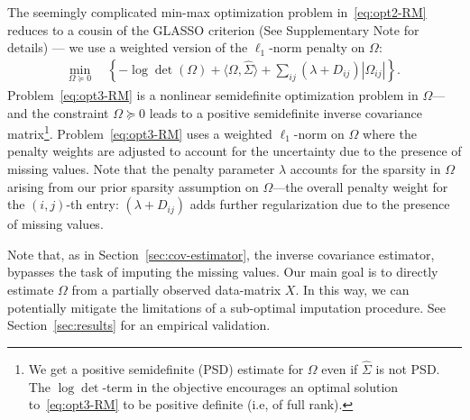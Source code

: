 The seemingly complicated min-max optimization problem in~\eqref{eq:opt2-RM}
reduces to a cousin of the GLASSO criterion (See Supplementary Note for details) --- we use a weighted version of the $\ell_{1}$-norm penalty on $\Omega$: 
\begin{equation}\label{eq:opt3-RM}
    \begin{aligned}
    \min_{\Omega \succeq 0} ~~ & \left \{- \log \det ( \Omega ) + \langle \Omega, \hat{\Sigma} \rangle +  \sum_{ij} (\lambda +  D_{ij})|\Omega_{ij}|  \right \}.
    \end{aligned}
\end{equation}
Problem~\eqref{eq:opt3-RM} is a nonlinear semidefinite optimization problem in $\Omega$---and the constraint $\Omega \succeq 0$ leads to a positive semidefinite inverse covariance matrix\footnote{We get a positive semidefinite (PSD) estimate for $\Omega$ even if $\hat{\Sigma}$ is not PSD. The $\log\det$-term in the objective encourages an optimal solution to~\eqref{eq:opt3-RM} to be positive definite (i.e, of full rank).}.
Problem~\eqref{eq:opt3-RM} uses a weighted $\ell_{1}$-norm on $\Omega$ where the penalty weights are adjusted to account for the uncertainty due to the presence of missing values. Note that the penalty parameter $\lambda$ accounts for the sparsity in $\Omega$ arising from our prior sparsity assumption on $\Omega$---the overall penalty weight for the $(i,j)$-th entry: $(\lambda + D_{ij})$ adds further regularization due to the presence of missing values. 

Note that, as in Section~\ref{sec:cov-estimator}, the \Robocov{} inverse covariance estimator, bypasses the task of imputing the missing values. Our main goal is to directly estimate $\Omega$ from a partially observed data-matrix $X$. In this way, we can potentially mitigate the limitations of a sub-optimal imputation procedure. See Section~\ref{sec:results} for an empirical validation. 


